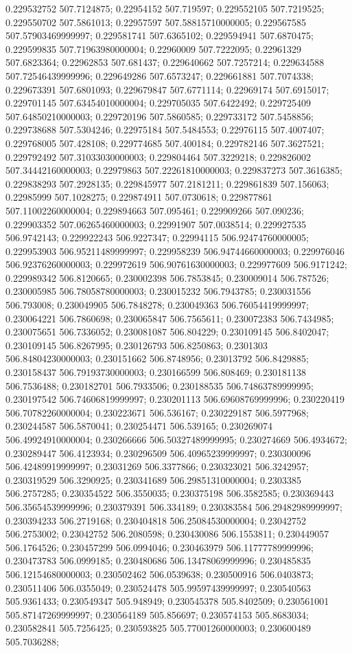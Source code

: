 0.229532752 507.7124875; 0.22954152 507.719597; 0.229552105 507.7219525; 0.229550702 507.5861013; 0.22957597 507.58815710000005; 0.229567585 507.57903469999997; 0.229581741 507.6365102; 0.229594941 507.6870475; 0.229599835 507.71963980000004; 0.22960009 507.7222095; 0.22961329 507.6823364; 0.22962853 507.681437; 0.229640662 507.7257214; 0.229634588 507.72546439999996; 0.229649286 507.6573247; 0.229661881 507.7074338; 0.229673391 507.6801093; 0.229679847 507.6771114; 0.22969174 507.6915017; 0.229701145 507.63454010000004; 0.229705035 507.6422492; 0.229725409 507.64850210000003; 0.229720196 507.5860585; 0.229733172 507.5458856; 0.229738688 507.5304246; 0.22975184 507.5484553; 0.22976115 507.4007407; 0.229768005 507.428108; 0.229774685 507.400184; 0.229782146 507.3627521; 0.229792492 507.31033030000003; 0.229804464 507.3229218; 0.229826002 507.34442160000003; 0.22979863 507.22261810000003; 0.229837273 507.3616385; 0.229838293 507.2928135; 0.229845977 507.2181211; 0.229861839 507.156063; 0.22985999 507.1028275; 0.229874911 507.0730618; 0.229877861 507.11002260000004; 0.229894663 507.095461; 0.229909266 507.090236; 0.229903352 507.06265460000003; 0.22991907 507.0038514; 0.229927535 506.9742143; 0.229922243 506.9227347; 0.22994115 506.92474760000005; 0.229953903 506.95211489999997; 0.229958239 506.94744660000003; 0.229976046 506.92376260000003; 0.229972619 506.90761630000003; 0.229977609 506.9171242; 0.229989342 506.8120665; 0.230002398 506.7853845; 0.230009014 506.787526; 0.230005985 506.78058780000003; 0.230015232 506.7943785; 0.230031556 506.793008; 0.230049905 506.7848278; 0.230049363 506.76054419999997; 0.230064221 506.7860698; 0.230065847 506.7565611; 0.230072383 506.7434985; 0.230075651 506.7336052; 0.230081087 506.804229; 0.230109145 506.8402047; 0.230109145 506.8267995; 0.230126793 506.8250863; 0.2301303 506.84804230000003; 0.230151662 506.8748956; 0.23013792 506.8429885; 0.230158437 506.79193730000003; 0.230166599 506.808469; 0.230181138 506.7536488; 0.230182701 506.7933506; 0.230188535 506.74863789999995; 0.230197542 506.74606819999997; 0.230201113 506.69608769999996; 0.230220419 506.70782260000004; 0.230223671 506.536167; 0.230229187 506.5977968; 0.230244587 506.5870041; 0.230254471 506.539165; 0.230269074 506.49924910000004; 0.230266666 506.50327489999995; 0.230274669 506.4934672; 0.230289447 506.4123934; 0.230296509 506.40965239999997; 0.230300096 506.42489919999997; 0.23031269 506.3377866; 0.230323021 506.3242957; 0.230319529 506.3290925; 0.230341689 506.29851310000004; 0.2303385 506.2757285; 0.230354522 506.3550035; 0.230375198 506.3582585; 0.230369443 506.35654539999996; 0.230379391 506.334189; 0.230383584 506.29482989999997; 0.230394233 506.2719168; 0.230404818 506.25084530000004; 0.23042752 506.2753002; 0.23042752 506.2080598; 0.230430086 506.1553811; 0.230449057 506.1764526; 0.230457299 506.0994046; 0.230463979 506.11777789999996; 0.230473783 506.0999185; 0.230480686 506.13478069999996; 0.230485835 506.12154680000003; 0.230502462 506.0539638; 0.230500916 506.0403873; 0.230511406 506.0355049; 0.230524478 505.99597439999997; 0.230540563 505.9361433; 0.230549347 505.948949; 0.230545378 505.8402509; 0.230561001 505.87147269999997; 0.230564189 505.856697; 0.230574153 505.8683034; 0.230582841 505.7256425; 0.230593825 505.77001260000003; 0.230600489 505.7036288; 